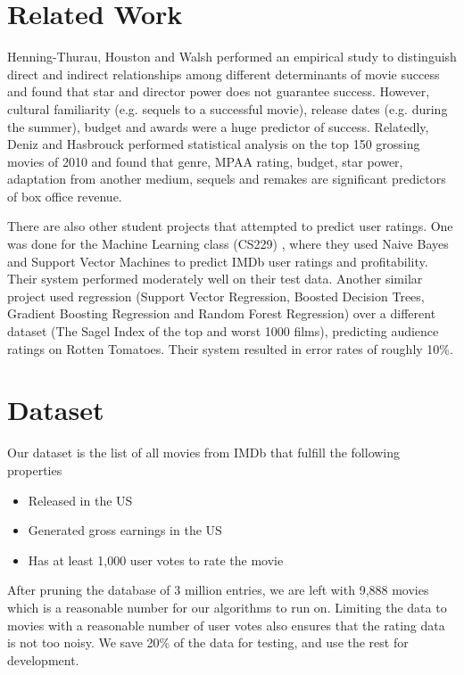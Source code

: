 \documentclass[journal]{IEEEtran}
\begin{document}
\section{Related Work}
Henning-Thurau, Houston and Walsh \cite{marketing} performed an empirical study
to distinguish direct and indirect relationships among different determinants
of movie success and found that star and director power does not guarantee
success. However, cultural familiarity (e.g. sequels to a successful movie),
release dates (e.g. during the summer), budget and awards were a huge predictor
of success. Relatedly, Deniz and Hasbrouck \cite{greenlight} performed
statistical analysis on the top 150 grossing movies of 2010 and found that
genre, MPAA rating, budget, star power, adaptation from another medium, sequels
and remakes are significant predictors
of box office revenue.
\\
\par There are also other student projects that attempted to predict user
ratings. One was done for the Machine Learning class (CS229) \cite{hitorflop},
where they used Naive Bayes and Support Vector Machines to predict IMDb user
ratings and profitability. Their system performed moderately well on their test
data. Another similar project \cite{cooper} used regression (Support Vector
Regression, Boosted Decision Trees, Gradient Boosting Regression and Random
Forest Regression) over a different dataset (The Sagel Index of the top and
worst 1000 films), predicting audience ratings on Rotten Tomatoes. Their system
resulted in error rates of roughly 10\%.

\section{Dataset}
Our dataset is the list of all movies from IMDb that fulfill the following properties
\\
\begin{itemize}
	\item Released in the US
	\item Generated gross earnings in the US
	\item Has at least 1,000 user votes to rate the movie
\end{itemize}
\bigskip

\par After pruning the database of 3 million entries, we are left with 9,888
movies which is a reasonable number for our algorithms to run on. Limiting the
data to movies with a reasonable number of user votes also ensures that the
rating data is not too noisy. We save 20\% of the data for testing, and use the
rest for development.
\end{document}
